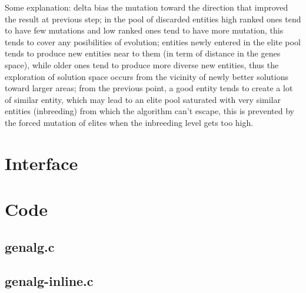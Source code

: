 Some explanation: delta bias the mutation toward the direction that improved the result at previous step; in the pool of discarded entities high ranked ones tend to have few mutations and low ranked ones tend to have more mutation, this tends to cover any posibilities of evolution; entities newly entered in the elite pool tends to produce new entities near to them (in term of distance in the genes space), while older ones tend to produce more diverse new entities, thus the exploration of solution space occurs from the vicinity of newly better solutions toward larger areas; from the previous point, a good entity tends to create a lot of similar entity, which may lead to an elite pool saturated with very similar entities (inbreeding) from which the algorithm can't escape, this is prevented by the forced mutation of elites when the inbreeding level gets too high.\\

\section{Interface}

\begin{scriptsize}
\begin{ttfamily}

\end{ttfamily}
\end{scriptsize}

\section{Code}

\subsection{genalg.c}

\begin{scriptsize}
\begin{ttfamily}

\end{ttfamily}
\end{scriptsize}

\subsection{genalg-inline.c}

\begin{scriptsize}
\begin{ttfamily}

\end{ttfamily}
\end{scriptsize}

